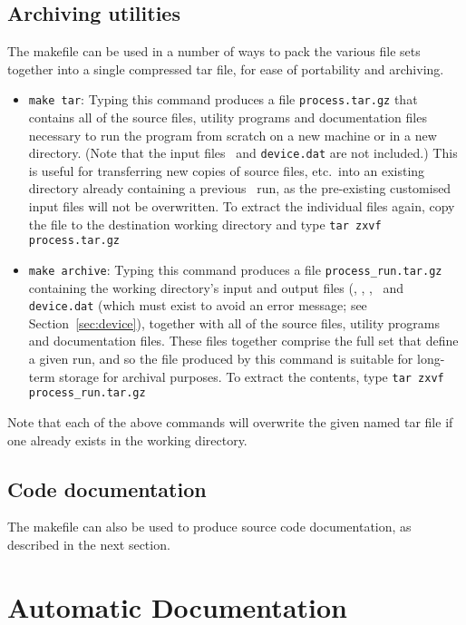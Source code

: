 \subsection{Archiving utilities}

The makefile can be used in a number of ways to pack the various file sets
together into a single compressed tar file, for ease of portability and
archiving.

\begin{itemize}

\item \texttt{make tar}: Typing this command produces a file
  \texttt{process.tar.gz} that contains all of the source files, utility
  programs and documentation files necessary to run the program from scratch
  on a new machine or in a new directory. (Note that the input files \indat\
  and \texttt{device.dat} are not included.) This is useful for transferring
  new copies of source files, etc.\ into an existing directory already
  containing a previous \process\ run, as the pre-existing customised input
  files will not be overwritten. To extract the individual files again, copy
  the file to the destination working directory and type
  \verb+tar zxvf process.tar.gz+

\item \texttt{make archive}: Typing this command produces a file
  \texttt{process\_run.tar.gz} containing the working directory's input and
  output files (\indat, \outdat, \plotdat, \mfile\ and \texttt{device.dat}
  (which must exist to avoid an error message; see Section~\ref{sec:device}),
  together with all of the source files, utility programs and documentation
  files. These files together comprise the full set that define a given run,
  and so the file produced by this command is suitable for long-term storage
  for archival purposes. To extract the contents, type
  \verb+tar zxvf process_run.tar.gz+
\end{itemize}

Note that each of the above commands will overwrite the given named tar file
if one already exists in the working directory.

\subsection{Code documentation}

The makefile can also be used to produce source code documentation, as
described in the next section.

\section{Automatic Documentation}
\label{sec:autodoc}

